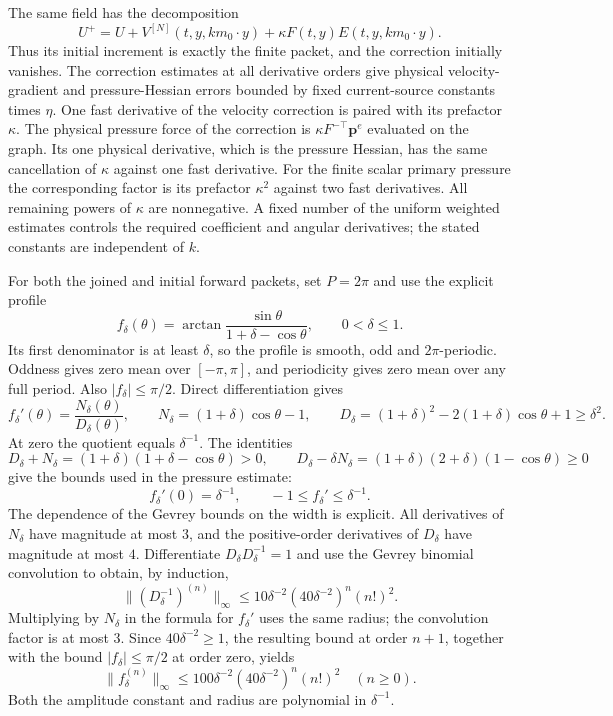 \documentclass[11pt]{article}
\theoremstyle{definition}
\begin{document}
The same field has the decomposition
\[
 U^+=U+V^{[N]}(t,y,km_0\cdot y)
        +\kappa F(t,y)E(t,y,km_0\cdot y).
\]
Thus its initial increment is exactly the finite packet, and the
correction initially vanishes. The correction estimates at all derivative orders give
physical velocity-gradient and pressure-Hessian errors bounded by fixed
current-source constants times $\eta$. One fast derivative of the velocity
correction is paired with its prefactor $\kappa$. The physical pressure
force of the correction is
$\kappa F^{-\top}\mathbf p^e$ evaluated on the graph. Its one
physical derivative, which is the pressure Hessian, has the same
cancellation of $\kappa$ against one fast derivative. For the finite
scalar primary pressure the corresponding factor is its prefactor
$\kappa^2$ against two fast derivatives. All remaining powers of
$\kappa$ are nonnegative. A fixed number of the uniform weighted
estimates controls the required coefficient and angular derivatives;
the stated constants are independent of $k$.

For both the joined and initial forward packets, set $P=2\pi$ and use
the explicit profile
\[
 f_\delta(\theta)=\arctan\frac{\sin\theta}{1+\delta-\cos\theta},
 \qquad 0<\delta\le1.
\]
Its first denominator is at least $\delta$, so the profile is smooth,
odd and $2\pi$-periodic. Oddness gives zero mean over $[-\pi,\pi]$,
and periodicity gives zero mean over any full period. Also
$|f_\delta|\le\pi/2$. Direct differentiation gives
\[
 f_\delta'(\theta)=\frac{N_\delta(\theta)}{D_\delta(\theta)},\qquad
 N_\delta=(1+\delta)\cos\theta-1,\qquad
 D_\delta=(1+\delta)^2-2(1+\delta)\cos\theta+1\ge\delta^2.
\]
At zero the quotient equals $\delta^{-1}$. The identities
\[
 D_\delta+N_\delta=(1+\delta)(1+\delta-\cos\theta)>0,
 \qquad
 D_\delta-\delta N_\delta
   =(1+\delta)(2+\delta)(1-\cos\theta)\ge0
\]
give the bounds used in the pressure estimate:
\[
 f_\delta'(0)=\delta^{-1},\qquad -1\le f_\delta'\le\delta^{-1}.
\]
The dependence of the Gevrey bounds on the width is explicit.
All derivatives of
$N_\delta$ have magnitude at most $3$, and the positive-order
derivatives of $D_\delta$ have magnitude at most $4$.
Differentiate $D_\delta D_\delta^{-1}=1$ and use the Gevrey binomial
convolution to obtain, by induction,
\[
 \|(D_\delta^{-1})^{(n)}\|_\infty
 \le 10\delta^{-2}(40\delta^{-2})^n(n!)^2.
\]
Multiplying by $N_\delta$ in the formula for $f_\delta'$ uses the same
radius; the convolution factor is at most $3$. Since $40\delta^{-2}\ge1$,
the resulting bound at order $n+1$, together with the bound
$|f_\delta|\le\pi/2$ at order zero, yields
\[
 \|f_\delta^{(n)}\|_\infty
 \le100\delta^{-2}(40\delta^{-2})^n(n!)^2\quad(n\ge0).
\]
Both the amplitude constant and radius are polynomial in $\delta^{-1}$.
\end{document}
